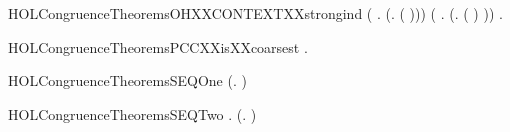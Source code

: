 \begin{SaveVerbatim}{HOLCongruenceTheoremsOHXXCONTEXTXXstrongind}
       (\HOLSymConst{\HOLTokenForall{}} .
              \HOLSymConst{\HOLTokenConj{}}   \HOLSymConst{\HOLTokenImp{}}
             (\HOLTokenLambda{}. \HOLConst{\ensuremath{\nu}}  ( ))) \HOLSymConst{\HOLTokenConj{}}
       (\HOLSymConst{\HOLTokenForall{}} .
              \HOLSymConst{\HOLTokenConj{}}   \HOLSymConst{\HOLTokenImp{}}
             (\HOLTokenLambda{}.  ( ) )) \HOLSymConst{\HOLTokenImp{}}
       \HOLSymConst{\HOLTokenForall{}}.   \HOLSymConst{\HOLTokenImp{}}  
\end{SaveVerbatim}
\newcommand{\HOLCongruenceTheoremsOHXXCONTEXTXXstrongind}{\UseVerbatim{HOLCongruenceTheoremsOHXXCONTEXTXXstrongind}}
\begin{SaveVerbatim}{HOLCongruenceTheoremsPCCXXisXXcoarsest}
\HOLTokenTurnstile{} \HOLSymConst{\HOLTokenForall{}} .   \HOLSymConst{\HOLTokenConj{}}    \HOLSymConst{\HOLTokenImp{}}    
\end{SaveVerbatim}
\newcommand{\HOLCongruenceTheoremsPCCXXisXXcoarsest}{\UseVerbatim{HOLCongruenceTheoremsPCCXXisXXcoarsest}}
\begin{SaveVerbatim}{HOLCongruenceTheoremsSEQOne}
\HOLTokenTurnstile{}  (\HOLTokenLambda{}. )
\end{SaveVerbatim}
\newcommand{\HOLCongruenceTheoremsSEQOne}{\UseVerbatim{HOLCongruenceTheoremsSEQOne}}
\begin{SaveVerbatim}{HOLCongruenceTheoremsSEQTwo}
\HOLTokenTurnstile{} \HOLSymConst{\HOLTokenForall{}}.  (\HOLTokenLambda{}. )
\end{SaveVerbatim}
\newcommand{\HOLCongruenceTheoremsSEQTwo}{\UseVerbatim{HOLCongruenceTheoremsSEQTwo}}
